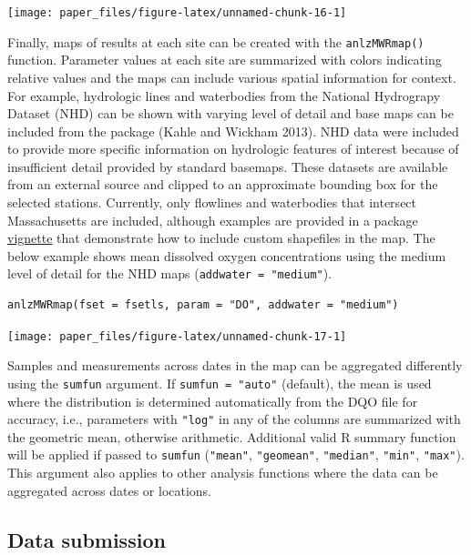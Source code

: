 \begin{center}\texttt{[image: paper\_files/figure-latex/unnamed-chunk-16-1]} \end{center}

Finally, maps of results at each site can be created with the \texttt{anlzMWRmap()} function. Parameter values at each site are summarized with colors indicating relative values and the maps can include various spatial information for context. For example, hydrologic lines and waterbodies from the National Hydrograpy Dataset (NHD) can be shown with varying level of detail and base maps can be included from the  package (Kahle and Wickham 2013). NHD data were included to provide more specific information on hydrologic features of interest because of insufficient detail provided by standard basemaps. These datasets are available from an external source and clipped to an approximate bounding box for the selected stations. Currently, only flowlines and waterbodies that intersect Massachusetts are included, although examples are provided in a package \href{https://massbays-tech.github.io/MassWateR/articles/modifying.html\#modifying-masswater-plots}{vignette} that demonstrate how to include custom shapefiles in the map. The below example shows mean dissolved oxygen concentrations using the medium level of detail for the NHD maps (\texttt{addwater\ =\ "medium"}).

\begin{verbatim}
anlzMWRmap(fset = fsetls, param = "DO", addwater = "medium")
\end{verbatim}

\begin{center}\texttt{[image: paper\_files/figure-latex/unnamed-chunk-17-1]} \end{center}

Samples and measurements across dates in the map can be aggregated differently using the \texttt{sumfun} argument. If \texttt{sumfun\ =\ "auto"} (default), the mean is used where the distribution is determined automatically from the DQO file for accuracy, i.e., parameters with \texttt{"log"} in any of the columns are summarized with the geometric mean, otherwise arithmetic. Additional valid R summary function will be applied if passed to \texttt{sumfun} (\texttt{"mean"}, \texttt{"geomean"}, \texttt{"median"}, \texttt{"min"}, \texttt{"max"}). This argument also applies to other analysis functions where the data can be aggregated across dates or locations.

\hypertarget{data-submission}{%
\subsection{Data submission}\label{data-submission}}

